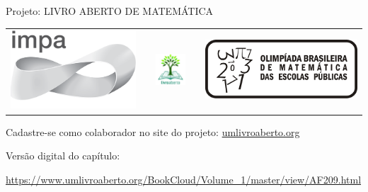 \begin{center}
Projeto: LIVRO ABERTO DE MATEMÁTICA

\noindent \begin{tabular}{lcccr}
\includegraphics[scale=.15]{impa}& \quad\quad& \includegraphics[width=3cm]{logo} & \quad\quad& \includegraphics[scale=.24]{obmep} 
\end{tabular}
\end{center}

\vspace*{.3cm}

Cadastre-se como colaborador no site do projeto: \url{umlivroaberto.org}

Versão digital do capítulo:

\url{https://www.umlivroaberto.org/BookCloud/Volume_1/master/view/AF209.html}


